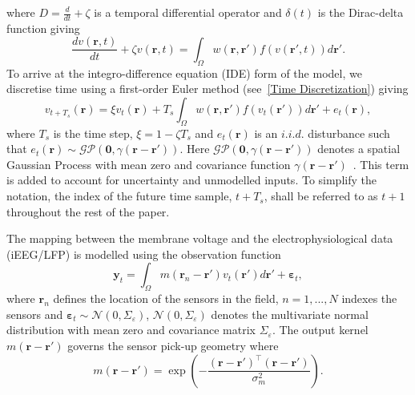 \documentclass[10pt]{article}
\begin{document}
where $D=\frac{d}{dt} + \zeta$ is a temporal differential operator and $\delta(t)$ is the Dirac-delta function giving 
\begin{equation}
	\label{FinalFormContinuous} 
	\frac{dv\left( \mathbf{r},t \right)}{dt} + \zeta v\left( \mathbf{r},t \right) = \int_\Omega {w\left( \mathbf{r},\mathbf{r}' \right)f\left( {v\left( \mathbf{r}',t \right)} \right)d\mathbf{r}'}. 
\end{equation}
To arrive at the integro-difference equation (IDE) form of the model, we discretise time using a first-order Euler method (see~\ref{Time Discretization}) giving 
\begin{equation}
	\label{DiscreteTimeModel} 
	v_{t+T_s}\left(\mathbf{r}\right) = 
	\xi v_t\left(\mathbf{r}\right) + 
	T_s \int_\Omega { 
	    w\left(\mathbf{r},\mathbf{r}'\right)
	    f\left(v_t\left(\mathbf{r}'\right)\right) 
	d\mathbf{r}'} 
	+ e_t\left(\mathbf{r}\right), 
\end{equation}
where $T_s$ is the time step, $\xi = 1-\zeta T_s$ and $e_t(\mathbf{r})$ is an $i.i.d.$ disturbance such that $e_t(\mathbf{r})\sim\mathcal{GP}(\mathbf 0,\gamma(\mathbf{r}-\mathbf{r}'))$. Here $\mathcal{GP}(\mathbf 0,\gamma(\mathbf{r}-\mathbf{r}'))$ denotes a spatial Gaussian Process with mean zero and covariance function $\gamma(\mathbf{r}-\mathbf{r}')$~\cite{Rasmussen2005}. This term is added to account for uncertainty and unmodelled inputs. To simplify the notation, the index of the future time sample, $t+T_s$, shall be referred to as $t+1$ throughout the rest of the paper. 

The mapping between the membrane voltage and the electrophysiological data (iEEG/LFP) is modelled using the observation function 
\begin{equation}
    \label{eq:ObservationEquation}
	\mathbf{y}_t =
	\int_{\Omega}{
	    m\left(\mathbf{r}_n-\mathbf{r}'\right)v_t\left(\mathbf{r}'\right)
	d\mathbf{r}'} + 
	\boldsymbol{\varepsilon}_t, 
\end{equation}
where $\mathbf{r}_n$ defines the location of the sensors in the field, $n=1,...,N$ indexes the sensors and $\boldsymbol{\varepsilon}_t \sim \mathcal{N}\left(0,\Sigma_{\varepsilon}\right)$, $\mathcal{N}\left(0,\Sigma_{\varepsilon}\right)$ denotes the multivariate normal distribution with mean zero and covariance matrix $\Sigma_{\varepsilon}$. The output kernel $m(\mathbf{r}-\mathbf{r}')$ governs the sensor pick-up geometry where 
\begin{equation}
	m\left(\mathbf{r}-\mathbf{r}'\right) = \exp{\left(-\frac{(\mathbf{r}-\mathbf{r}')^\top(\mathbf{r}-\mathbf{r}')}{\sigma_m^2}\right)}. 
\end{equation}
\end{document}
